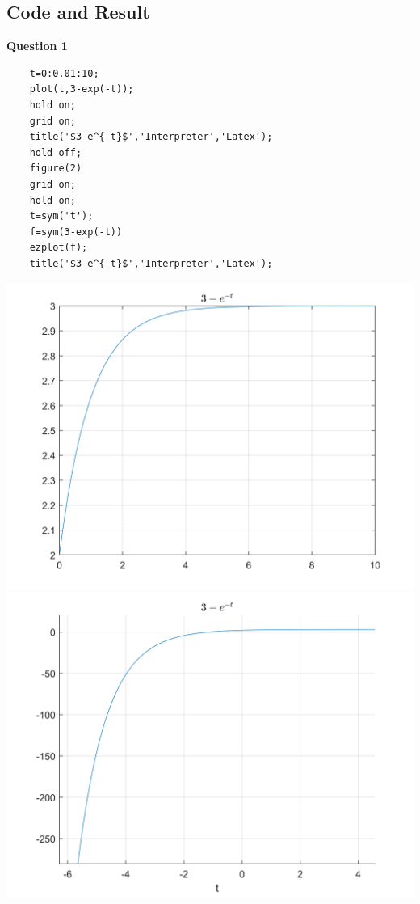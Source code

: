 \documentclass[UTF8,a4paper]{article}
\begin{document}
\subsection{Code and Result}
\textbf{Question 1}\\
\begin{lstlisting}
    t=0:0.01:10;
    plot(t,3-exp(-t));
    hold on;
    grid on;
    title('$3-e^{-t}$','Interpreter','Latex');
    hold off;
    figure(2)
    grid on;
    hold on;
    t=sym('t');
    f=sym(3-exp(-t))
    ezplot(f);
    title('$3-e^{-t}$','Interpreter','Latex');
\end{lstlisting}
\includegraphics[scale=0.5]{8-1-1.png}
\includegraphics[scale=0.5]{8-1-2.png}\\
\end{document}
